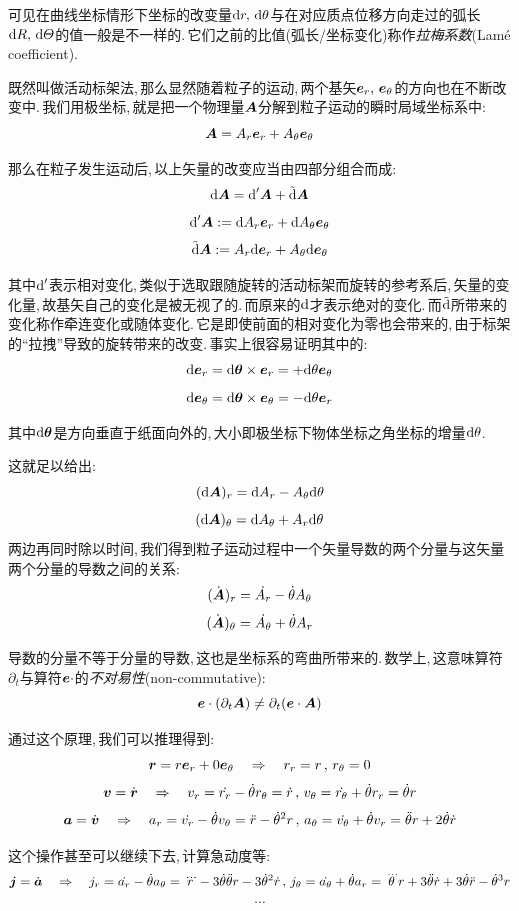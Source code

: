 可见在曲线坐标情形下坐标的改变量$\textrm{d} r,\,\textrm{d} \theta$与在对应质点位移方向走过的弧长$\textrm{d} R,\,\textrm{d} \varTheta$的值一般是不一样的.\,它们之前的比值(弧长/坐标变化)称作\emph{拉梅系数}(Lam\'e coefficient).

\vspace{0.5cm}
既然叫做活动标架法,\,那么显然随着粒子的运动,\,两个基矢$\boldsymbol{e}_r,\,\boldsymbol{e}_\theta$的方向也在不断改变中.\,我们用极坐标,\,就是把一个物理量$\boldsymbol{A}$分解到粒子运动的瞬时局域坐标系中:
\[\boldsymbol{A}=A_r\boldsymbol{e}_r+A_\theta\boldsymbol{e}_\theta\]

那么在粒子发生运动后,\,以上矢量的改变应当由四部分组合而成:
\[\textrm{d} \boldsymbol{A}=\textrm{d}'\boldsymbol{A}+\tilde{\textrm{d}}\boldsymbol{A} \]
\[\textrm{d}' \boldsymbol{A}:=\textrm{d} A_r\boldsymbol{e}_r+\textrm{d} A_\theta\boldsymbol{e}_\theta\]
\[\tilde{\textrm{d}}\boldsymbol{A}:= A_r\textrm{d}\boldsymbol{e}_r+ A_\theta\textrm{d}\boldsymbol{e}_\theta\]

其中$\textrm{d}'$表示相对变化,\,类似于选取跟随旋转的活动标架而旋转的参考系后,\,矢量的变化量,\,故基矢自己的变化是被无视了的.\,而原来的$\textrm{d}$才表示绝对的变化.\,而$\tilde{\textrm{d}}$所带来的变化称作牵连变化或随体变化.\,它是即使前面的相对变化为零也会带来的,\,由于标架的``拉拽''导致的旋转带来的改变.\,事实上很容易证明其中的:
\[\textrm{d} \boldsymbol{e}_r=\textrm{d} \boldsymbol{\theta}\times \boldsymbol{e}_r=+\textrm{d} \theta \boldsymbol{e}_\theta\]
\[\textrm{d} \boldsymbol{e}_\theta=\textrm{d} \boldsymbol{\theta}\times \boldsymbol{e}_\theta=-\textrm{d} \theta \boldsymbol{e}_r\]

其中$\textrm{d} \boldsymbol{\theta}$是方向垂直于纸面向外的,\,大小即极坐标下物体坐标之角坐标的增量$\textrm{d} \theta$.

这就足以给出:
\[(\textrm{d} \boldsymbol{A})_r=\textrm{d} A_r-A_\theta \textrm{d} \theta\]
\[(\textrm{d} \boldsymbol{A})_\theta=\textrm{d} A_\theta+A_r \textrm{d} \theta\]
\newpage
两边再同时除以时间,\,我们得到粒子运动过程中一个矢量导数的两个分量与这矢量两个分量的导数之间的关系:
\[(\dot{\boldsymbol{A}})_r=\dot{A_r}-\dot{\theta}A_\theta\]
\[(\dot{\boldsymbol{A}})_\theta=\dot{A_\theta}+\dot{\theta}A_r\]

导数的分量不等于分量的导数,\,这也是坐标系的弯曲所带来的.\,数学上,\,这意味算符$\partial_t$与算符$\boldsymbol{e}\cdot$的\emph{不对易性}(non-commutative):
\[\boldsymbol{e}\cdot(\partial_t \boldsymbol{A})\neq \partial_t(\boldsymbol{e}\cdot \boldsymbol{A})\]

通过这个原理,\,我们可以推理得到:
\[\boldsymbol{r}=r\boldsymbol{e}_r+0\boldsymbol{e}_\theta\quad \Rightarrow\quad r_r=r\,,\,r_\theta=0\]
\[\boldsymbol{v}=\dot{\boldsymbol{r}}\quad \Rightarrow\quad  v_r=\dot{r_r}-\dot{\theta}r_\theta=\dot{r}\,,\,v_\theta=\dot{r_\theta}+\dot{\theta}r_r=\dot{\theta}r\]
\[\boldsymbol{a}=\dot{\boldsymbol{v}}\quad \Rightarrow\quad  a_r=\dot{v_r}-\dot{\theta}v_\theta=\ddot{r}-\dot{\theta}^2r\,,\,a_\theta=\dot{v_\theta}+\dot{\theta}v_r=\ddot{\theta}r+2\dot{\theta}\dot{r}\]

这个操作甚至可以继续下去,\,计算急动度等:
\[\boldsymbol{j}=\dot{\boldsymbol{a}}\quad \Rightarrow \quad j_r=\dot{a_r}-\dot{\theta}a_\theta=\dddot{r}-3\dot{\theta}\ddot{\theta}r-3\dot{\theta}^2\dot{r}\,,\,j_\theta=\dot{a_\theta}+\dot{\theta}a_r=\dddot{\theta}r+3\ddot{\theta}\dot{r}+3\dot{\theta}\ddot{r}-\dot{\theta}^3r\]
\[\cdots\]

